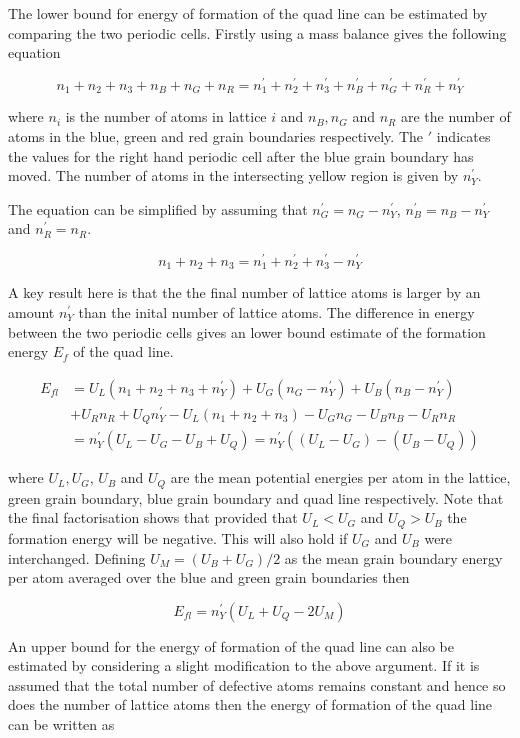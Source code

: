 \documentclass[12pt,a4paper]{book}
\begin{document}
The lower bound for energy of formation of the quad line can be estimated by comparing the two periodic cells. Firstly using a mass balance gives the following
equation

\[ n_1 + n_2 + n_3 + n_B + n_G + n_R = n_1^{\prime} + n_2^{\prime} + n_3^{\prime} + n_B^{\prime} + n_G^{\prime} + n_R^{\prime} +
n_Y^{\prime} \]

where $n_i$ is the number of atoms in lattice $i$ and $n_B, n_G$ and $n_R$ are the number of atoms in the blue, green and red grain boundaries respectively. The $\prime$ indicates the values for the right hand periodic cell after the blue grain boundary has moved.  The number of atoms in the intersecting yellow region is given by $n_Y^{\prime}$.

The equation can be simplified by assuming that $n_G^{\prime} = n_G-n_Y^{\prime}$, $n_B^{\prime} = n_B-n_Y^{\prime}$ and $n_R^{\prime} = n_R$. 

\[ n_1 + n_2 + n_3   = n_1^{\prime} + n_2^{\prime} + n_3^{\prime}- n_Y^{\prime} \]

A key result here is that the the final number of lattice atoms is larger by an amount $n_Y^{\prime}$ than the inital number of lattice atoms. The difference in energy between the two periodic cells gives an lower bound estimate of the formation energy $E_f$ of the quad line.

\begin{align*}
 E_{fl} &= U_L(n_1+n_2+n_3+n_Y^{\prime}) + U_G(n_G - n_Y^{\prime})
+ U_B(n_B - n_Y^{\prime}) \\ 
&+ U_R n_R + U_Q n_Y^{\prime}
- U_L(n_1+n_2+n_3) - U_G n_G - U_B n_B - U_R n_R  
\\ 
&=  n_Y^{\prime}(U_L - U_G - U_B + U_Q) = n_Y^{\prime}((U_L - U_G) - (U_B - U_Q)) 
\end{align*}

where $U_L, U_G$, $U_B$ and $U_Q$ are the mean potential energies per atom in the lattice, green grain boundary, blue grain boundary
and quad line respectively. Note that the final factorisation shows that provided that $U_L < U_G$ and $U_Q > U_B$ the formation energy will be negative. This will also hold if $U_G$ and $U_B$ were interchanged. Defining $U_M = (U_B + U_G)/2$ as the mean grain boundary energy per atom averaged over the blue and green grain boundaries then

\[E_{fl} =  n_Y^{\prime}(U_L + U_Q - 2U_M)\]


An upper bound for the energy of formation of the quad line can also be estimated by considering a slight modification to the above argument. If it is assumed that the total number of defective atoms remains constant and hence so does the number of lattice atoms then the energy of formation of the quad line can
be written as
\end{document}

